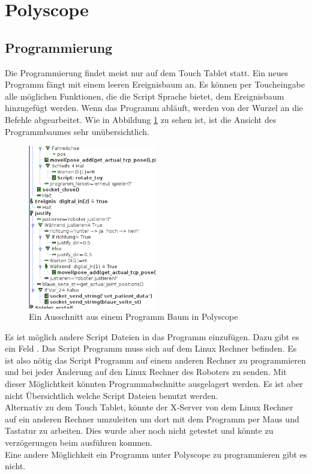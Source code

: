\section{Polyscope}
\label{sec:Polyscope_rel}

\subsection{Programmierung}
\label{sub:programmierung_polyscope_rel}

Die Programmierung findet meist nur auf dem Touch Tablet statt. Ein neues Programm fängt mit einem leeren Ereignisbaum an. Es können per Toucheingabe alle möglichen Funktionen, die die Script Sprache bietet, dem Ereignisbaum hinzugefügt werden. Wenn das Programm abläuft, werden von der Wurzel an die Befehle abgearbeitet.
Wie in Abbildung \ref{fig:programm_in_polyscope} zu sehen ist, ist die Ansicht des Programmbaumes sehr unübersichtlich.

\begin{figure}[H]
  \centering
    \includegraphics[width=0.5\textwidth]{pic/polyscope_program_tree.png}
      \caption[Programm Baum in Polyscope]{Ein Ausschnitt aus einem Programm Baum in Polyscope}
      \label{fig:programm_in_polyscope}
\end{figure}

Es ist möglich andere Script Dateien in das Programm einzufügen. Dazu gibt es ein Feld . Das Script Programm muss sich auf dem Linux Rechner befinden. Es ist also nötig das Script Programm auf einem anderen Rechner zu programmieren und bei jeder Änderung auf den Linux Rechner des Roboters zu senden. Mit dieser Möglichtkeit könnten Programmabschnitte ausgelagert werden. Es ist aber nicht Übersichtlich welche Script Dateien benutzt werden.\\
Alternativ zu dem Touch Tablet, könnte der X-Server von dem Linux Rechner auf ein anderen Rechner umzuleiten um dort mit dem Programm per Maus und Tastatur zu arbeiten. Dies wurde aber noch nicht getestet und könnte zu verzögerungen beim ausführen kommen.
\\
Eine andere Möglichkeit ein Programm unter Polyscope zu programmieren gibt es nicht.

